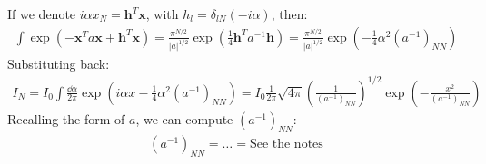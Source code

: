 \documentclass[../template.tex]{subfiles}
\begin{document}
If we denote $i \alpha x_N = \bm{h}^T \bm{x}$, with $h_l = \delta_{lN} (-i \alpha)$, then:
\begin{align*}
    \int \exp(-\bm{x}^T a \bm{x} + \bm{h}^T \bm{x}) = \frac{\pi^{N/2}}{|a|^{1/2}}\exp\left(\frac{1}{4} \bm{h}^T a^{-1}\bm{h} \right) = \frac{\pi^{N/2}}{|a|^{1/2}} \exp\left(-\frac{1}{4}\alpha^2 (a^{-1})_{NN} \right)  
\end{align*}
Substituting back:
\begin{align*}
    I_N = I_0 \int \frac{\dd{\alpha}}{2 \pi} \exp\left(i \alpha x - \frac{1}{4} \alpha^2 (a^{-1})_{NN}\right)  = I_0 \frac{1}{2 \pi} \sqrt{4 \pi} \left(\frac{1}{(a^{-1})_{NN}} \right)^{1/2} \exp\left(-\frac{x^2}{(a^{-1})_{NN}} \right) 
\end{align*}
Recalling the form of $a$, we can compute $(a^{-1})_{NN}$:
\begin{align*}
    (a^{-1})_{NN} = \dots = \text{See the notes}
\end{align*}  
\end{document}
